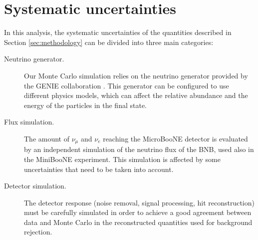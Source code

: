 \section{Systematic uncertainties}\label{sec:systematics}
In this analysis, the systematic uncertainties of the quantities described in Section \ref{sec:methodology} can be divided into three main categories: 
\begin{description}
\item[Neutrino generator.] Our Monte Carlo simulation relies on the neutrino generator provided by the GENIE collaboration \cite{genie}. This generator can be configured to use different physics models, which can affect the relative abundance and the energy of the particles in the final state.
\item[Flux simulation.] The amount of $\nu_{\mu}$ and $\nu_{e}$ reaching the MicroBooNE detector is evaluated by an independent simulation of the neutrino flux of the BNB, used also in the MiniBooNE experiment. This simulation is affected by some uncertainties that need to be taken into account.
\item[Detector simulation.] The detector response (noise removal, signal processing, hit reconstruction) must be carefully simulated in order to achieve a good agreement between data and Monte Carlo in the reconstructed quantities used for background rejection. 
\end{description}

